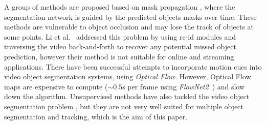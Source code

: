 \documentclass[10pt,twocolumn,letterpaper]{article}
\begin{document}
A group of methods are proposed based on mask propagation \cite{masktrack, Oh_2018_CVPR}, where the segmentation network is guided by the predicted objects masks over time. These methods are vulnerable to object occlusion and may lose the track of objects at some points. 
Li et al.~\cite{Li_2018_ECCV} addressed this problem by using re-id modules and traversing the video back-and-forth to recover any potential missed object prediction, however their method is not suitable for online and streaming applications.
There have been successful attempts to incorporate motion cues into video object segmentation systems, using {\it Optical Flow}\cite{hu2017maskrnn, Hu_2018_CVPR, Xiao_2018_CVPR, Bao_2018_CVPR, Cheng_2017_ICCV, Jain_2017_CVPR, Tsai_2016_CVPR, Yeo_2017_CVPR, Jang_2017_CVPR}. However, Optical Flow maps are expensive to compute ($\sim 0.5$s per frame using {\it FlowNet2}~\cite{flownet2}) and slow down the algorithm.
Unsupervised methods have also tackled the video object segmentation problem \cite{Li_2018_ECCV_un, Hu_2018_ECCV_un, Li_2018_CVPR, Tokmakov_2017_ICCV, Koh_2017_CVPR, Jain_2017_CVPR}, but they are not very well suited for multiple object segmentation and tracking, which is the aim of this paper.%
\end{document}
